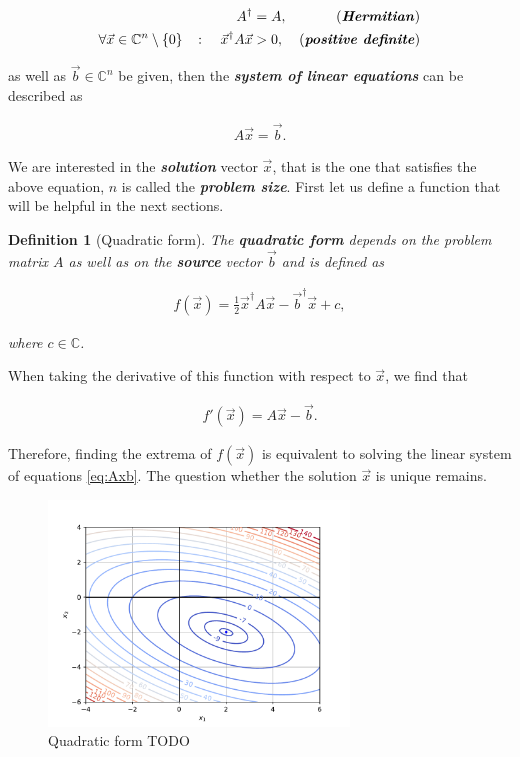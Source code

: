 \documentclass{article}
\theoremstyle{plain} %
\newtheorem{definition}{Definition}[section]
\theoremstyle{convention} %
\theoremstyle{remark} %
\def\df#1{\textbf{\textit{#1}}}
\numberwithin{equation}{section}
\begin{document}
\begin{align*}
    A^{\dagger} &= A, &\text{(\df{Hermitian})} \\
    \forall \vec{x} \in \mathbb{C}^n \setminus \{0\} \quad \colon \quad \vec{x}^{\dagger} A \vec{x} &> 0, &\text{(\df{positive definite})}
\end{align*}

as well as $\vec{b} \in \mathbb{C}^n$ be given, then the \df{system of linear equations} can be described as

\begin{align}
    A \vec{x} = \vec{b}. \label{eq:Axb}
\end{align}

We are interested in the \df{solution} vector $\vec{x}$, that is the one that satisfies the above equation, $n$ is called the \df{problem size}. First let us define a function that will be helpful in the next sections.

\begin{definition}[Quadratic form]

The \df{quadratic form} depends on the problem matrix $A$ as well as on the \df{source} vector $\vec{b}$ and is defined as

\begin{align*}
    f(\vec{x}) = \frac{1}{2} \vec{x}^{\dagger} A \vec{x} - \vec{b}^{\dagger} \vec{x} + c,
\end{align*}

where $c \in \mathbb{C}$.

\end{definition}

When taking the derivative of this function with respect to $\vec{x}$, we find that

\begin{align*}
    f'(\vec{x}) = A \vec{x} - \vec{b}.
\end{align*}

Therefore, finding the extrema of $f(\vec{x})$ is equivalent to solving the linear system of equations \eqref{eq:Axb}. The question whether the solution $\vec{x}$ is unique remains.

\begin{figure}
    \centering
    \includegraphics[width=8cm]{plots/qform_contour}
    \caption{Quadratic form TODO}
    \label{fig:qform}
\end{figure}
\end{document}
